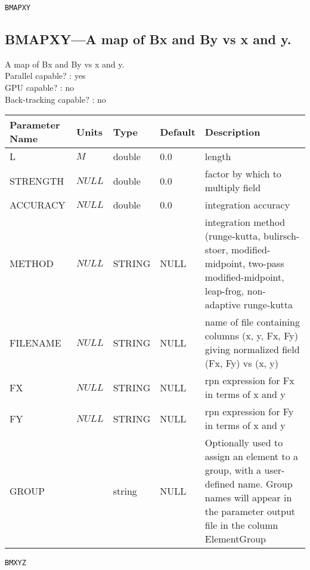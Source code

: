 \vspace*{0.5in}

\newpage
\begin{center}{\Large\verb|BMAPXY|}\end{center}
\subsection{BMAPXY---A map of Bx and By vs x and y.}
A map of Bx and By vs x and y.
\\
Parallel capable? : yes\\
GPU capable? : no\\
Back-tracking capable? : no\\
\begin{tabular}{|l|l|l|l|p{\descwidth}|} \hline
Parameter Name & Units & Type & Default & Description \\ \hline 
L & $M$ & double &  0.0 & length  \\ \hline 
STRENGTH & $NULL$ & double &  0.0 & factor by which to multiply field  \\ \hline 
ACCURACY & $NULL$ & double &  0.0 & integration accuracy  \\ \hline 
METHOD & $NULL$ & STRING &   NULL            & integration method (runge-kutta, bulirsch-stoer, modified-midpoint, two-pass modified-midpoint, leap-frog, non-adaptive runge-kutta  \\ \hline 
FILENAME & $NULL$ & STRING &   NULL            & name of file containing columns (x, y, Fx, Fy) giving normalized field (Fx, Fy) vs (x, y)  \\ \hline 
FX & $NULL$ & STRING &   NULL            & rpn expression for Fx in terms of x and y  \\ \hline 
FY & $NULL$ & STRING &   NULL            & rpn expression for Fy in terms of x and y  \\ \hline 
GROUP &  & string & NULL & Optionally used to assign an element to a group, with a user-defined name.  Group names will appear in the parameter output file in the column ElementGroup  \\ \hline 
\end{tabular}

\vspace*{0.5in}

\newpage
\begin{center}{\Large\verb|BMXYZ|}\end{center}
